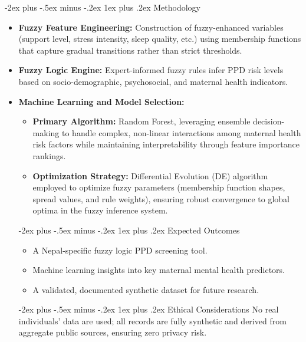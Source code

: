 \documentclass[conference]{IEEEtran}
\makeatletter
\def\section{\@startsection{section}{1}{0mm}
  {-2ex plus -.5ex minus -.2ex}
  {1ex plus .2ex}
  {\normalfont\large\bfseries}}
\makeatother
\begin{document}
\section{Methodology}
\begin{itemize}  
    \item \textbf{Fuzzy Feature Engineering:} Construction of fuzzy-enhanced variables (support level, stress intensity, sleep quality, etc.) using membership functions that capture gradual transitions rather than strict thresholds.
    \item \textbf{Fuzzy Logic Engine:} Expert-informed fuzzy rules infer PPD risk levels based on socio-demographic, psychosocial, and maternal health indicators.
    \item \textbf{Machine Learning and Model Selection:}
    \begin{itemize}
        \item \textbf{Primary Algorithm:} Random Forest, leveraging ensemble decision-making to handle complex, non-linear interactions among maternal health risk factors while maintaining interpretability through feature importance rankings.
        \item \textbf{Optimization Strategy:} Differential Evolution (DE) algorithm employed to optimize fuzzy parameters (membership function shapes, spread values, and rule weights), ensuring robust convergence to global optima in the fuzzy inference system.
    \end{itemize}

 

\vspace{-6pt}
\section{Expected Outcomes}
\begin{itemize}
    \item A Nepal-specific fuzzy logic PPD screening tool.
    \item Machine learning insights into key maternal mental health predictors.
    \item A validated, documented synthetic dataset for future research.
\end{itemize}

\vspace{-6pt}
\section{Ethical Considerations}
No real individuals’ data are used; all records are fully synthetic and derived from aggregate public sources, ensuring zero privacy risk.


\end{itemize}
\end{document}
